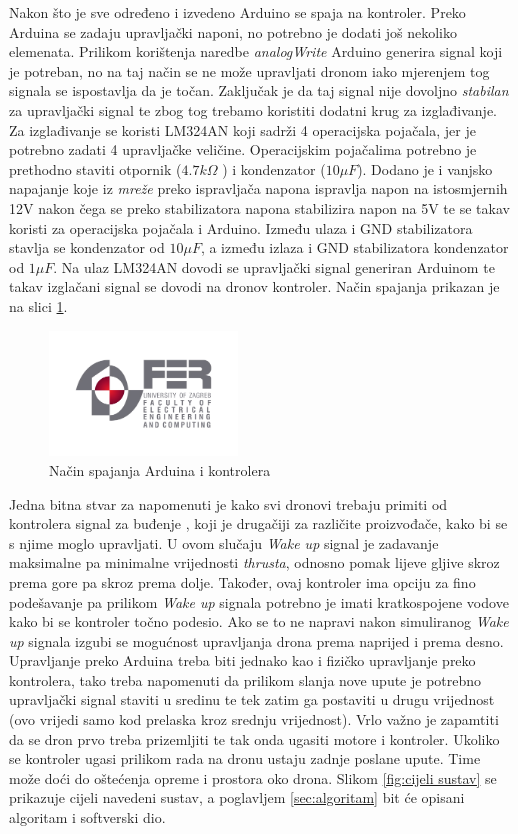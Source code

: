 \documentclass[times, utf8, diplomski]{fer}
\begin{document}
Nakon što je sve određeno i izvedeno Arduino se spaja na kontroler. Preko Arduina se zadaju upravljački naponi, no potrebno je dodati još nekoliko elemenata. Prilikom korištenja naredbe \emph{analogWrite} Arduino generira signal koji je potreban, no na taj način se ne može upravljati dronom iako mjerenjem tog signala se ispostavlja da je točan. Zaključak je da taj signal nije dovoljno \emph{stabilan} za upravljački signal te zbog tog trebamo koristiti dodatni krug za izglađivanje. Za izglađivanje se koristi LM324AN koji sadrži 4 operacijska pojačala, jer je potrebno zadati 4 upravljačke veličine. Operacijskim pojačalima potrebno je prethodno staviti otpornik ($4.7k\Omega$ ) i kondenzator ($10 \mu F$). Dodano je i vanjsko napajanje koje iz \emph{mreže} preko ispravljača napona ispravlja napon na istosmjernih 12V nakon čega se preko stabilizatora napona stabilizira napon na 5V te se takav koristi za operacijska pojačala i Arduino. Između ulaza i GND stabilizatora stavlja se kondenzator od $10\mu F$, a između izlaza i GND stabilizatora kondenzator od $1\mu F$. Na ulaz LM324AN dovodi se upravljački signal generiran Arduinom te takav izglačani signal se dovodi na dronov kontroler. Način spajanja prikazan je na slici \ref{fig:spajanje}.
\begin{figure}[htb]
\centering
\includegraphics[width=5cm]{img/fer_logo.jpg}
\caption{Način spajanja Arduina i kontrolera\protect\footnotemark}
\label{fig:spajanje}
\end{figure}
Jedna bitna stvar za napomenuti je kako svi dronovi trebaju primiti od kontrolera signal za buđenje , koji je drugačiji za različite proizvođače, kako bi se s njime moglo upravljati. U ovom slučaju \emph{Wake up} signal je zadavanje maksimalne pa minimalne vrijednosti \emph{thrusta}, odnosno pomak lijeve gljive skroz prema gore pa skroz prema dolje. Također, ovaj kontroler ima opciju za fino podešavanje pa prilikom \emph{Wake up} signala potrebno je imati kratkospojene vodove kako bi se kontroler točno podesio. Ako se to ne napravi nakon simuliranog \emph{Wake up} signala izgubi se mogućnost upravljanja drona prema naprijed i prema desno. Upravljanje preko Arduina treba biti jednako kao i fizičko upravljanje preko kontrolera, tako treba napomenuti da prilikom slanja nove upute  je potrebno upravljački signal staviti u sredinu te tek zatim ga postaviti u drugu vrijednost (ovo vrijedi samo kod prelaska kroz srednju vrijednost). Vrlo važno je zapamtiti da se dron prvo treba prizemljiti te tak onda ugasiti motore i kontroler. Ukoliko se kontroler ugasi prilikom rada na dronu ustaju zadnje poslane upute. Time može doći do oštećenja opreme i prostora oko drona. Slikom \ref{fig:cijeli sustav} se prikazuje cijeli navedeni sustav, a poglavljem \ref{sec:algoritam} bit će opisani algoritam i softverski dio.
\end{document}
